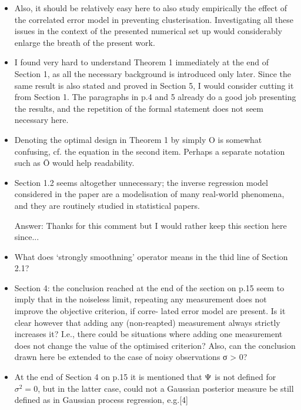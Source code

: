 \documentclass{amsart}
\begin{document}
\begin{itemize}
\item Also, it should be relatively easy here to also study empirically the effect of the correlated
error model in preventing clusterisation. Investigating all these issues in the context of the
presented numerical set up would considerably enlarge the breath of the present work.

\item I found very hard to understand Theorem 1 immediately at the end
  of Section 1, as all the necessary background is introduced only
  later. Since the same result is also stated and proved in Section 5,
  I would consider cutting it from Section 1. The paragraphs in p.4
  and 5 already do a good job presenting the results, and the
  repetition of the formal statement does not seem necessary here.

\item Denoting the optimal design in Theorem 1 by simply O is somewhat confusing, cf. the
equation in the second item. Perhaps a separate notation such as Ō would help readability.

\item Section 1.2 seems altogether unnecessary; the inverse regression model considered in the
paper are a modelisation of many real-world phenomena, and they are routinely studied in
statistical papers.

Answer: Thanks for this comment but I would rather keep this section
here since...


\item What does ‘strongly smoothning’ operator means in the thid line of Section 2.1?

\item Section 4: the conclusion reached at the end of the section on
  p.15 seem to imply that in the noiseless limit, repeating any
  measurement does not improve the objective criterion, if corre-
  lated error model are present. Is it clear however that adding any
  (non-reapted) measurement always strictly increases it? I.e., there
  could be situations where adding one measurement does not change the
  value of the optimised criterion? Also, can the conclusion drawn
  here be extended to the case of noisy observations σ > 0?

\item At the end of Section 4 on p.15 it is mentioned that $\Psi$ is not
  defined for $\sigma^2= 0$, but in the latter case, could not a Gaussian
  posterior measure be still defined as in Gaussian process
  regression, e.g.[4]


\end{itemize}
\end{document}
